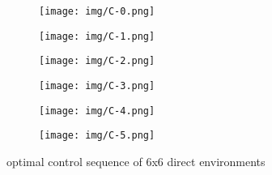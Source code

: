 \documentclass[conference]{IEEEtran}
\begin{document}
\begin{figure*}
    \centering
    \begin{subfigure}{0.3\textwidth}
    \texttt{[image: img/C-0.png]}
    \end{subfigure}
    \hfill
    \begin{subfigure}{0.3\textwidth}
    \texttt{[image: img/C-1.png]}
    \end{subfigure}
    \hfill
    \begin{subfigure}{0.3\textwidth}
    \texttt{[image: img/C-2.png]}
    \end{subfigure}
    
    \begin{subfigure}{0.3\textwidth}
    \texttt{[image: img/C-3.png]}
    \end{subfigure}
    \hfill
    \begin{subfigure}{0.3\textwidth}
    \texttt{[image: img/C-4.png]}
    \end{subfigure}
    \hfill
    \begin{subfigure}{0.3\textwidth}
    \texttt{[image: img/C-5.png]}
    \end{subfigure}
\caption{optimal control sequence of 6x6 direct environments}
\label{fig:knwon_seq0}
\end{figure*}
\end{document}
